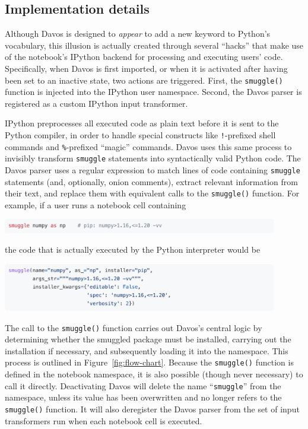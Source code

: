 \documentclass[preprint,12pt,a4paper]{elsarticle}
\begin{document}
\subsection{Implementation details}\label{subsec:implementation}

Although Davos is designed to \textit{appear} to add a new
keyword to Python's vocabulary, this illusion is actually created through
several ``hacks'' that make use of the notebook's IPython backend
for processing and executing users' code.  Specifically, when
Davos is first imported, or when it is activated after having been
set to an inactive state, two actions are triggered.  First, the
\texttt{smuggle()} function is injected into the IPython user
namespace.  Second, the Davos parser is registered as a
custom IPython input transformer.

IPython preprocesses all executed code as plain text before it is sent
to the Python compiler, in order to handle special constructs like
\texttt{!}-prefixed shell commands and \texttt{\%}-prefixed ``magic'' commands. Davos uses
this same process to invisibly transform \texttt{smuggle} statements into
syntactically valid Python code. The Davos parser uses a
regular expression to match lines of code containing \texttt{smuggle}
statements (and, optionally, onion comments), extract relevant
information from their text, and replace them with equivalent calls to
the \texttt{smuggle()} function. For example, if a user runs a
notebook cell containing
\begin{center}
\includegraphics[width=0.9\textwidth]{figs/snippet6}
\end{center}
the code that is actually executed by the Python interpreter would be
\begin{center}
\includegraphics[width=0.9\textwidth]{figs/snippet7}
\end{center}
The call to the \texttt{smuggle()} function carries out
Davos's central logic by determining whether the smuggled
package must be installed, carrying out the installation if necessary,
and subsequently loading it into the namespace. This process is
outlined in Figure~\ref{fig:flow-chart}. Because the
\texttt{smuggle()} function is defined in the notebook namespace, it
is also possible (though never necessary) to call it
directly. Deactivating Davos will delete the name
``\texttt{smuggle}'' from the namespace, unless its value has been
overwritten and no longer refers to the \texttt{smuggle()}
function. It will also deregister the Davos parser from the
set of input transformers run when each notebook cell is
executed.
\end{document}
